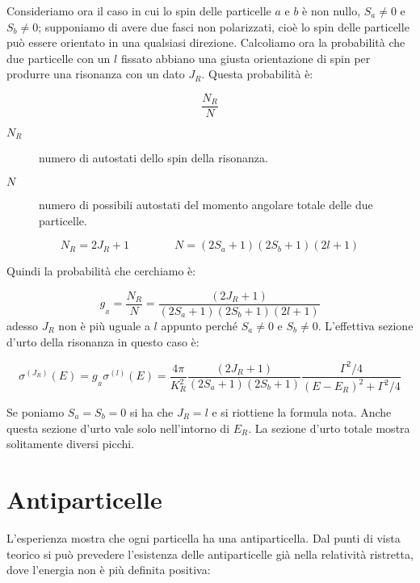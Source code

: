 Consideriamo ora il caso in cui lo spin delle particelle $a$ e $b$ è non nullo,
$S_a \ne 0$ e $S_b \ne 0$; supponiamo di avere due fasci non polarizzati, cioè
lo spin delle particelle può essere orientato in una qualsiasi direzione.
Calcoliamo ora la probabilità che due particelle con un $l$ fissato abbiano una
giusta orientazione di spin per produrre una risonanza con un dato $J_R$. Questa
probabilità è:

\begin{equation*}
\dfrac{N_R}{N} 
\end{equation*}
\begin{description}
\item[$N_R$] numero di autostati dello spin della risonanza.
\item[$N$] numero di possibili autostati del momento angolare totale delle due
  particelle.
\end{description}

\begin{equation*}
N_R = 2 J_R + 1	\qquad  \qquad	N = (2 S_a + 1)(2 S_b + 1)(2 l + 1)
\end{equation*}

Quindi la probabilità che cerchiamo è:

\begin{equation*}
g_{_{R}} = \dfrac{N_R}{N} = \dfrac{(2 J_R + 1)}{(2 S_a + 1)(2 S_b + 1)(2 l + 1)}
\end{equation*}
adesso $J_R$ non è più uguale a $l$ appunto perché $S_a \ne 0$ e $S_b \ne 0$.
L'effettiva sezione d'urto della risonanza in questo caso è:

\begin{equation*}
\sigma^{(J_R)} (E) = g_{_{R}} \sigma^{(l)} (E) = \dfrac{4 \pi}{K^2_R} \dfrac{(2 J_R +1)}{(2 S_a + 1)(2 S_b + 1)} \dfrac{\Gamma^2 /4}{(E-E_R)^2 + \Gamma^2/4}
\end{equation*}

Se poniamo $S_a = S_b = 0$ si ha che $J_R = l$ e si riottiene la formula nota. 
Anche questa sezione d'urto vale solo nell'intorno di $E_R$. La sezione d'urto
totale mostra solitamente diversi picchi.

\chapter{Antiparticelle}
L'esperienza mostra che ogni particella ha una antiparticella. Dal punti di
vista teorico si può prevedere l'esistenza delle antiparticelle già nella
relatività ristretta, dove l'energia non è più definita positiva:

